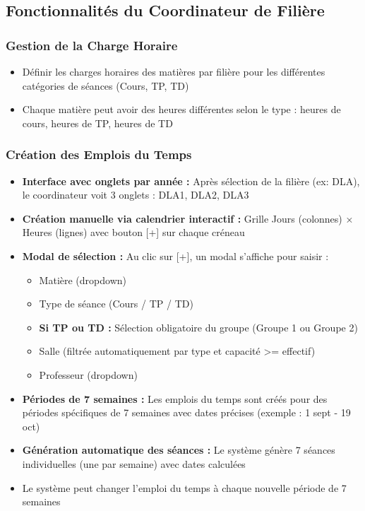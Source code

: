 \documentclass[12pt,a4paper]{article}
\begin{document}
\subsection{Fonctionnalités du Coordinateur de Filière}

\subsubsection{Gestion de la Charge Horaire}
\begin{itemize}
    \item Définir les charges horaires des matières par filière pour les différentes catégories de séances (Cours, TP, TD)
    \item Chaque matière peut avoir des heures différentes selon le type : heures de cours, heures de TP, heures de TD
\end{itemize}

\subsubsection{Création des Emplois du Temps}
\begin{itemize}
    \item \textbf{Interface avec onglets par année :} Après sélection de la filière (ex: DLA), le coordinateur voit 3 onglets : DLA1, DLA2, DLA3
    
    \item \textbf{Création manuelle via calendrier interactif :} Grille Jours (colonnes) × Heures (lignes) avec bouton [+] sur chaque créneau
    
    \item \textbf{Modal de sélection :} Au clic sur [+], un modal s'affiche pour saisir :
    \begin{itemize}
        \item Matière (dropdown)
        \item Type de séance (Cours / TP / TD)
        \item \textbf{Si TP ou TD :} Sélection obligatoire du groupe (Groupe 1 ou Groupe 2)
        \item Salle (filtrée automatiquement par type et capacité >= effectif)
        \item Professeur (dropdown)
    \end{itemize}
    
    \item \textbf{Périodes de 7 semaines :} Les emplois du temps sont créés pour des périodes spécifiques de 7 semaines avec dates précises (exemple : 1 sept - 19 oct)
    
    \item \textbf{Génération automatique des séances :} Le système génère 7 séances individuelles (une par semaine) avec dates calculées
    
    \item Le système peut changer l'emploi du temps à chaque nouvelle période de 7 semaines
\end{itemize}
\end{document}
